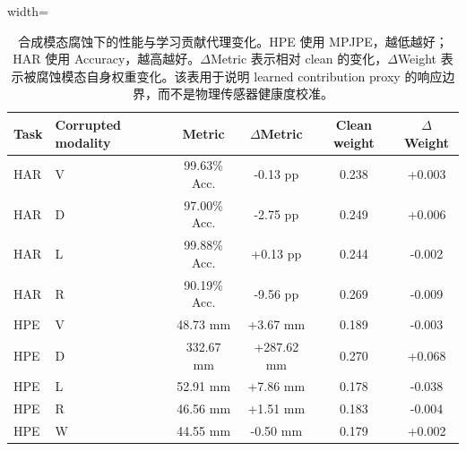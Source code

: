\begin{table}[!htbp]
\centering
\caption{合成模态腐蚀下的性能与学习贡献代理变化。HPE 使用 MPJPE，越低越好；HAR 使用 Accuracy，越高越好。$\Delta$Metric 表示相对 clean 的变化，$\Delta$Weight 表示被腐蚀模态自身权重变化。该表用于说明 learned contribution proxy 的响应边界，而不是物理传感器健康度校准。}
\label{tab:reliability_corruption_cn}
\scriptsize
\begin{adjustbox}{width=\textwidth}
\begin{tabular}{llcccc}
\toprule
Task & Corrupted modality & Metric & $\Delta$Metric & Clean weight & $\Delta$Weight \\
\midrule
HAR & V & 99.63\% Acc. & -0.13 pp & 0.238 & +0.003 \\
HAR & D & 97.00\% Acc. & -2.75 pp & 0.249 & +0.006 \\
HAR & L & 99.88\% Acc. & +0.13 pp & 0.244 & -0.002 \\
HAR & R & 90.19\% Acc. & -9.56 pp & 0.269 & -0.009 \\
\midrule
HPE & V & 48.73 mm & +3.67 mm & 0.189 & -0.003 \\
HPE & D & 332.67 mm & +287.62 mm & 0.270 & +0.068 \\
HPE & L & 52.91 mm & +7.86 mm & 0.178 & -0.038 \\
HPE & R & 46.56 mm & +1.51 mm & 0.183 & -0.004 \\
HPE & W & 44.55 mm & -0.50 mm & 0.179 & +0.002 \\
\bottomrule
\end{tabular}
\end{adjustbox}
\end{table}

